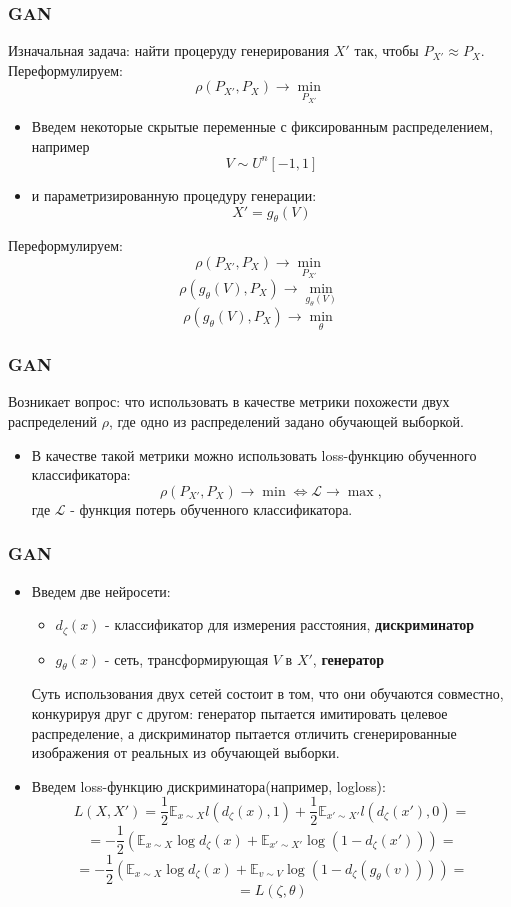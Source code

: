 \documentclass[9pt]{beamer}
\begin{document}
\begin{frame}\frametitle{GAN}
	Изначальная задача: найти процеруду генерирования $X'$ так, чтобы $ P_{X'} \approx P_X$.
	Переформулируем:
	$$ \rho(P_{X'}, P_X) \longrightarrow \underset{P_{X'}}{\min} $$
	\begin{itemize}
		\item Введем некоторые скрытые переменные с фиксированным распределением, например
		$$ V \sim U^n [-1, 1] $$
		\item и параметризированную процедуру генерации:
		$$ X' = g_{\theta}(V) $$
	\end{itemize}
	Переформулируем:
	$$ \rho(P_{X'}, P_X) \longrightarrow \underset{P_{X'}}{\min} $$
	$$ \rho(g_{\theta}(V), P_X) \longrightarrow \underset{g_{\theta}(V)}{\min} $$
	$$ \rho(g_{\theta}(V), P_X) \longrightarrow \underset{\theta}{\min} $$
\end{frame}

\begin{frame}\frametitle{GAN}
	Возникает вопрос: что использовать в качестве метрики похожести двух распределений $\rho$, где одно из распределений задано обучающей выборкой.
	\begin{itemize}
		\item В качестве такой метрики можно использовать loss-функцию обученного классификатора:
		$$ \rho(P_{X'}, P_X) \longrightarrow \min \Leftrightarrow \mathcal{L} \longrightarrow \max, $$
		где $\mathcal{L}$ - функция потерь обученного классификатора.
	\end{itemize}
\end{frame}

\begin{frame}\frametitle{GAN}
	\begin{itemize}
		\item Введем две нейросети:
		\begin{itemize}
			\item $d_{\zeta}(x)$ - классификатор для измерения расстояния, \textbf{дискриминатор}
			\item $g_{\theta}(x)$ - сеть, трансформирующая $V$ в $X'$, \textbf{генератор}
		\end{itemize}
		Суть использования двух сетей состоит в том, что они обучаются совместно, конкурируя друг с другом: генератор пытается имитировать целевое распределение, а дискриминатор пытается отличить сгенерированные изображения от реальных из обучающей выборки.
		\item Введем loss-функцию дискриминатора(например, logloss):
		$$ L(X, X') = \frac{1}{2} \mathbb{E}_{x \sim X} l(d_{\zeta}(x), 1) + \frac{1}{2} \mathbb{E}_{x' \sim X'} l(d_{\zeta}(x'), 0) = $$
		 $$ = -\frac{1}{2} (\mathbb{E}_{x \sim X} \log d_{\zeta}(x) + \mathbb{E}_{x' \sim X'} \log (1 - d_{\zeta}(x'))) = $$
		 $$ =  -\frac{1}{2} (\mathbb{E}_{x \sim X} \log d_{\zeta}(x) + \mathbb{E}_{v \sim V} \log (1 - d_{\zeta}(g_{\theta}(v)))) = $$
		 $$ = L(\zeta, \theta) $$
	\end{itemize}
\end{frame}
\end{document}
